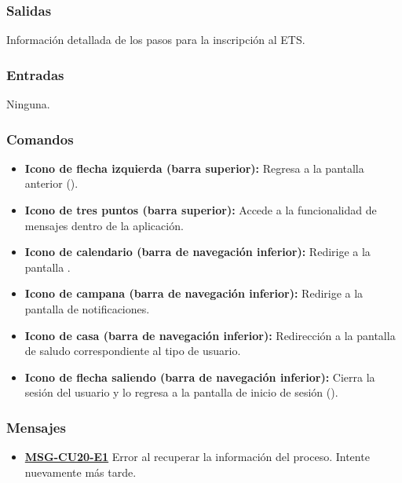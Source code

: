\subsubsection{Salidas}
Información detallada de los pasos para la inscripción al ETS.

\subsubsection{Entradas}
Ninguna.

\subsubsection{Comandos}
\begin{itemize}
	\item \textbf{Icono de flecha izquierda (barra superior):} Regresa a la pantalla anterior ().
	\item \textbf{Icono de tres puntos (barra superior):} Accede a la funcionalidad de mensajes dentro de la aplicación.
	\item \textbf{Icono de calendario (barra de navegación inferior):} Redirige a la pantalla .
	\item \textbf{Icono de campana (barra de navegación inferior):} Redirige a la pantalla de notificaciones.
	\item \textbf{Icono de casa (barra de navegación inferior):} Redirección a la pantalla de saludo correspondiente al tipo de usuario.
	\item \textbf{Icono de flecha saliendo (barra de navegación inferior):} Cierra la sesión del usuario y lo regresa a la pantalla de inicio de sesión ().
\end{itemize}

\subsubsection{Mensajes}
\begin{itemize}
	\item \textbf{\hyperref[msg:CU20-E1]{MSG-CU20-E1}} Error al recuperar la información del proceso. Intente nuevamente más tarde.
\end{itemize}

